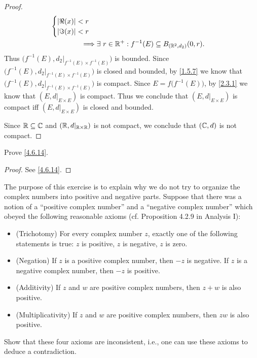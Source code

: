 \begin{proof}
\begin{align*}
\begin{cases}
                                                        \left\lvert\Re(x)\right\rvert < r \\
                                                        \left\lvert\Im(x)\right\rvert < r
                                                      \end{cases}                                                               \\
    \implies & \exists\ r \in \mathbb{R}^+ : f^{-1}(E) \subseteq B_{(\mathbb{R}^2, d_2)}(0, r).
  \end{align*}
  Thus \(\big(f^{-1}(E), d_2|_{f^{-1}(E) \times f^{-1}(E)}\big)\) is bounded.
  Since \(\big(f^{-1}(E), d_2|_{f^{-1}(E) \times f^{-1}(E)}\big)\) is closed and bounded, by \cref{1.5.7} we know that \(\big(f^{-1}(E), d_2|_{f^{-1}(E) \times f^{-1}(E)}\big)\) is compact.
  Since \(E = f\big(f^{-1}(E)\big)\), by \cref{2.3.1} we know that \((E, d|_{E \times E})\) is compact.
  Thus we conclude that \((E, d|_{E \times E})\) is compact iff \((E, d|_{E \times E})\) is closed and bounded.

  Since \(\mathbb{R} \subseteq \mathbb{C}\) and \((\mathbb{R}, d|_{\mathbb{R} \times \mathbb{R}})\) is not compact, we conclude that \((\mathbb{C}, d)\) is not compact.
\end{proof}

\begin{ex}\label{ex:4.6.14}
  Prove \cref{4.6.14}.
\end{ex}

\begin{proof}
  See \cref{4.6.14}.
\end{proof}

\begin{ex}\label{ex:4.6.15}
  The purpose of this exercise is to explain why we do not try to organize the complex numbers into positive and negative parts.
  Suppose that there was a notion of a ``positive complex number'' and a ``negative complex number'' which obeyed the following reasonable axioms (cf. Proposition 4.2.9 in Analysis I):
  \begin{itemize}
    \item (Trichotomy)
          For every complex number \(z\), exactly one of the following statements is true:
          \(z\) is positive, \(z\) is negative, \(z\) is zero.
    \item (Negation)
          If \(z\) is a positive complex number, then \(-z\) is negative.
          If \(z\) is a negative complex number, then \(-z\) is positive.
    \item (Additivity)
          If \(z\) and \(w\) are positive complex numbers, then \(z + w\) is also positive.
    \item (Multiplicativity)
          If \(z\) and \(w\) are positive complex numbers, then \(zw\) is also positive.
  \end{itemize}
  Show that these four axioms are inconsistent, i.e., one can use these axioms to deduce a contradiction.
\end{ex}

